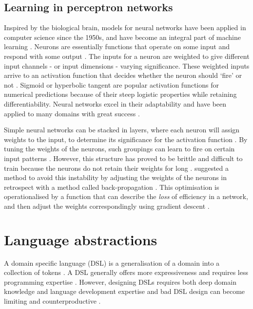 \documentclass[a4paper,oneside]{memoir}
\begin{document}
\subsection{Learning in perceptron networks}
Inspired by the biological brain, models for neural networks have been applied
in computer science since the 1950s, and have become an integral part of machine
learning \autocite{Nilsson2009, russel2007}.
Neurons are essentially functions that operate on some input and respond with
some output \autocite{russel2007}. The inputs for a neuron are weighted to give
different input channels - or input dimensions - varying significance. These
weighted inputs arrive to an activation function that decides whether the
neuron should ‘fire’ or not \autocite{Nilsson2009}. Sigmoid or hyperbolic tangent
are popular
activation functions for numerical predictions because of their steep logistic
properties while retaining differentiability. Neural networks excel in their
adaptability and have been applied to many domains with great success
\autocite{schmidhuber2014, russel2007, Pedersen2017}.

Simple neural networks can be stacked in layers, where each neuron will assign
weights to the input, to determine its significance for the activation function
\autocite{Nilsson2009}. By tuning the weights of the neurons, such groupings can
learn to fire on certain input patterns \autocite{russel2007}. However,
this structure has proved to be brittle and difficult to train because the
neurons do not retain their weights for long \autocite{Nilsson2009, russel2007}.
\autocite{Rumelhart1988} suggested a method to avoid this instability by adjusting
the weights of the neurons in retrospect with a method called back-propagation
\autocite{Rumelhart1988, Nilsson2009}. This optimisation is
operationalised by a function that can describe the \textit{loss} of efficiency
in a network, and then adjust the weights correspondingly using gradient
descent \autocite{russel2007}.

\section{Language abstractions}
A domain specific language (DSL) is a generalisation of a domain into a
collection of tokens \autocite{Mernik2005}. A DSL generally offers more
expressiveness and requires less programming expertise \autocite{Mernik2005, Sestoft2017}.
However, designing DSLs requires both deep domain knowledge and language
development expertise and bad DSL design can become limiting
and counterproductive \autocite{Mernik2005, Sestoft2017}.
\end{document}

